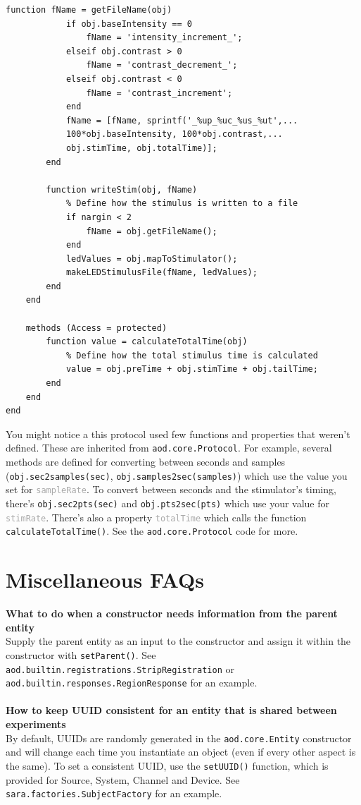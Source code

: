 \documentclass[10pt]{exam}
\newcommand\aodclass[1]{\textcolor{codeblue}{\texttt{#1}}}
\newcommand\aodprop[1]{\textcolor{darkgray}{\texttt{#1}}}
\newcommand\aodfcn[1]{\textcolor{darkteal}{\texttt{#1}}}
\begin{document}
\begin{lstlisting}[style=Matlab-editor, basicstyle=\mlttfamily\footnotesize]
		function fName = getFileName(obj)
			if obj.baseIntensity == 0
				fName = 'intensity_increment_';
			elseif obj.contrast > 0
				fName = 'contrast_decrement_';
			elseif obj.contrast < 0
				fName = 'contrast_increment';
			end
			fName = [fName, sprintf('_%up_%uc_%us_%ut',...
			100*obj.baseIntensity, 100*obj.contrast,... 
			obj.stimTime, obj.totalTime)];
		end
			
		function writeStim(obj, fName)
			% Define how the stimulus is written to a file
			if nargin < 2
				fName = obj.getFileName();
			end
			ledValues = obj.mapToStimulator();
			makeLEDStimulusFile(fName, ledValues);
		end
	end

	methods (Access = protected)
		function value = calculateTotalTime(obj)
			% Define how the total stimulus time is calculated
			value = obj.preTime + obj.stimTime + obj.tailTime;
		end
	end
end
		\end{lstlisting}
	\noindent 
	You might notice a this protocol used few functions and properties that weren't defined. These are inherited from \aodclass{aod.core.Protocol}. For example, several methods are defined for converting between seconds and samples (\aodfcn{obj.sec2samples(sec)}, \aodfcn{obj.samples2sec(samples)}) which use the value you set for \aodprop{sampleRate}. To convert between seconds and the stimulator's timing, there's \aodfcn{obj.sec2pts(sec)} and \aodfcn{obj.pts2sec(pts)} which use your value for \aodprop{stimRate}. There's also a property \aodprop{totalTime} which calls the function \aodfcn{calculateTotalTime()}. See the \aodclass{aod.core.Protocol} code for more.	

\section{Miscellaneous FAQs}
	\label{section:Misc}
	\noindent\textbf{What to do when a constructor needs information from the parent entity}\\
	Supply the parent entity as an input to the constructor and assign it within the constructor with \aodfcn{setParent()}. See \aodclass{aod.builtin.registrations.StripRegistration} or \aodclass{aod.builtin.responses.RegionResponse} for an example.
	\\$\quad$\\
	\noindent\textbf{How to keep UUID consistent for an entity that is shared between experiments}\\
	By default, UUIDs are randomly generated in the \aodclass{aod.core.Entity} constructor and will change each time you instantiate an object (even if every other aspect is the same). To set a consistent UUID, use the \aodfcn{setUUID()} function, which is provided for Source, System, Channel and Device. See \aodclass{sara.factories.SubjectFactory} for an example.
	
\end{document}

